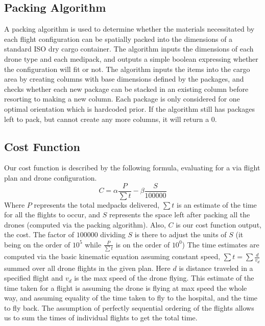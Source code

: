 \documentclass[twocolumn,10pt]{asme2ej}
\begin{document}
\subsection{Packing Algorithm}
A packing algorithm is used to determine whether the materials necessitated by each flight configuration can be spatially packed into the dimensions of a standard ISO dry cargo container. The algorithm inputs the dimensions of each drone type and each medipack, and outputs a simple boolean expressing whether the configuration will fit or not. The algorithm  inputs the items into the cargo area by creating columns with base dimensions defined by the packages, and checks whether each new package can be stacked in an existing column before resorting to making a new column. Each package is only considered for one optimal orientation which is hardcoded prior. If the algorithm still has packages left to pack, but cannot create any more columns, it will return a 0.

\subsection{Cost Function}
Our cost function is described by the following formula, evaluating for a via flight plan and drone configuration.
\[
C = \alpha \frac{P}{\sum{t}} - \beta \frac{S}{100000}
\]
Where $P$ represents the total medpacks delivered, $\sum{t}$ is an estimate of the time for all the flights to occur, and $S$ represents the space left after packing all the drones (computed via the packing algorithm). Also, $C$ is our cost function output, the cost. The factor of $100000$ dividing $S$ is there to adjust the units of $S$ (it being on the order of $10^5$ while $\frac{P}{\sum{t}}$ is on the order of $10^0$) The time estimates are computed via the basic kinematic equation assuming constant speed, $\sum{t}=\sum{\frac{d}{v_d}}$ summed over all drone flights in the given plan. Here $d$ is distance traveled in a specified flight and $v_d$ is the max speed of the drone flying. This estimate of the time taken for a flight is assuming the drone is flying at max speed the whole way, and assuming equality of the time taken to fly to the hospital, and the time to fly back. The assumption of perfectly sequential ordering of the flights allows us to sum the times of individual flights to get the total time.
\end{document}
